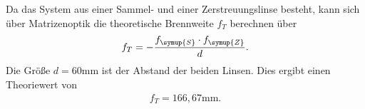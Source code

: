 \noindent Da das System aus einer Sammel- und einer Zerstreuungslinse besteht, kann sich über Matrizenoptik die theoretische Brennweite $f_T$ berechnen über
\begin{align*}
f_T = -\frac{f_{\symup{S}}\cdot f_{\symup{Z}}}{d}.
\end{align*}
Die Größe $d = 60 \si{\milli\meter}$ ist der Abstand der beiden Linsen.
Dies ergibt einen Theoriewert von 
\begin{align*}
f_T = 166,67 \si{\milli\meter}.
\end{align*}
